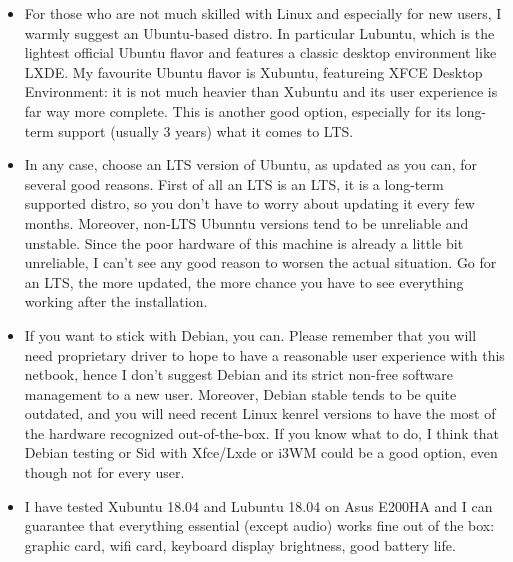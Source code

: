 \documentclass{article}
\begin{document}
\begin{itemize}
	\item For those who are not much skilled with Linux and especially for new users, I warmly suggest an Ubuntu-based distro. In particular Lubuntu, which is the lightest official Ubuntu flavor and features a classic desktop environment like LXDE. My favourite Ubuntu flavor is Xubuntu, featureing XFCE Desktop Environment: it is not much heavier than Xubuntu and its user experience is far way more complete. This is another good option, especially for its long-term support (usually 3 years) what it comes to LTS. 
	\item In any case, choose an LTS version of Ubuntu, as updated as you can, for several good reasons. First of all an LTS is an LTS, it is a long-term supported distro, so you don't have to worry about updating it every few months. Moreover, non-LTS Ubunntu versions tend to be unreliable and unstable. Since the poor hardware of this machine is already a little bit unreliable, I can't see any good reason to worsen the actual situation. Go for an LTS, the more updated, the more chance you have to see everything working after the installation.
	\item If you want to stick with Debian, you can. Please remember that you will need proprietary driver to hope to have a reasonable user experience with this netbook, hence I don't suggest Debian and its strict non-free software management to a new user. Moreover, Debian stable tends to be quite outdated, and you will need recent Linux kenrel versions to have the most of the hardware recognized out-of-the-box. If you know what to do, I think that Debian testing or Sid with Xfce/Lxde or i3WM could be a good option, even though not for every user.
	\item I have tested Xubuntu 18.04 and Lubuntu 18.04 on Asus E200HA and I can guarantee that everything essential (except audio) works fine out of the box: graphic card, wifi card, keyboard display brightness, good battery life. 
\end{itemize}
\end{document}
